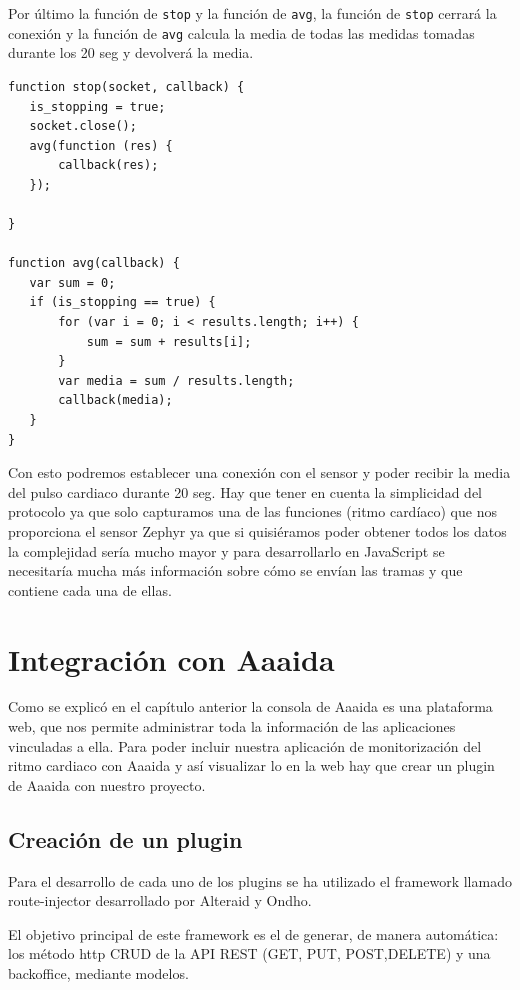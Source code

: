 Por último la función de \texttt{stop} y la función de \texttt{avg}, la función de \texttt{stop} cerrará la conexión y la función de \texttt{avg} calcula la media de todas las medidas tomadas durante los 20 seg y devolverá la media. 

\begin{verbatim}
function stop(socket, callback) {
   is_stopping = true;
   socket.close();
   avg(function (res) {
       callback(res);
   });

}

function avg(callback) {
   var sum = 0;
   if (is_stopping == true) {
       for (var i = 0; i < results.length; i++) {
           sum = sum + results[i];
       }
       var media = sum / results.length;
       callback(media);
   }
}
\end{verbatim}

Con esto podremos establecer una conexión con el sensor y poder recibir la media del pulso cardiaco durante 20 seg. Hay que tener en cuenta la simplicidad del protocolo ya que solo capturamos una de las funciones (ritmo cardíaco) que nos proporciona el sensor Zephyr ya que si quisiéramos poder obtener todos los datos la complejidad sería mucho mayor y para desarrollarlo en JavaScript se necesitaría mucha más información sobre cómo se envían las tramas y que contiene cada una de ellas. 
\pagebreak
\section{Integración con Aaaida}

Como se explicó en el capítulo anterior la consola de Aaaida es una plataforma web, que nos permite administrar toda la información de las aplicaciones vinculadas a ella. 
Para poder incluir nuestra aplicación de monitorización del ritmo cardiaco con Aaaida y así visualizar lo en la web hay que crear un plugin de Aaaida con nuestro proyecto. 

\subsection{Creación de un plugin}

Para el desarrollo de cada uno de los plugins se ha utilizado el framework llamado route-injector desarrollado por Alteraid y Ondho. 

El objetivo principal de este framework es el de generar, de manera automática:
los método http CRUD de la API REST (GET, PUT, POST,DELETE) y una
backoffice, mediante modelos.

